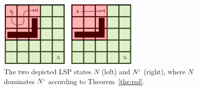 \documentclass[letterpaper]{article} %
\newcommand\Roni[1]{\nb{\textbf{Roni:}}{blue}{#1}}
\begin{document}



\begin{figure}[ht!]
  \centering
  \includegraphics[width=2.7in]{fig/rsd_example.png}
  \caption{The two depicted LSP states $N$ (left) and $N`$ (right), where
  $N$ dominates $N`$ according to Theorem~\ref{the:rsd}.}
  \label{rsd_example}
\end{figure}
\end{document}
